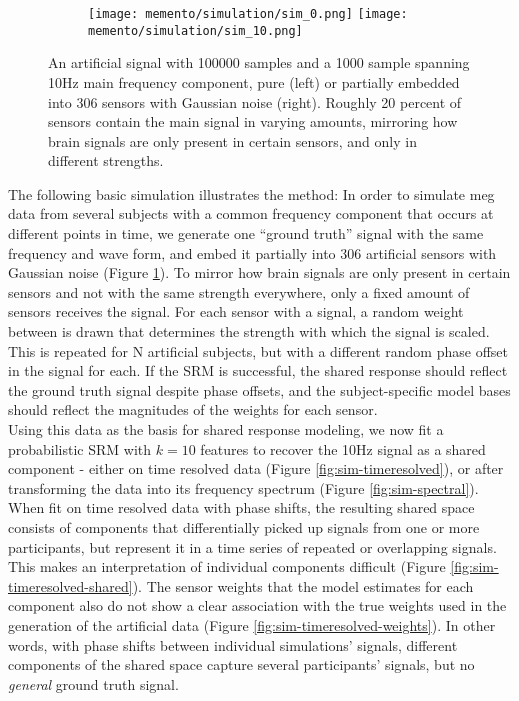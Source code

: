 \begin{figure}
	\begin{subfigure}{1.0\textwidth}
		\texttt{[image: memento/simulation/sim\_0.png]}
		\texttt{[image: memento/simulation/sim\_10.png]}
	\end{subfigure}
	\caption{An artificial signal with 100000 samples and a 1000 sample spanning 10Hz main frequency component, pure (left) or partially embedded into 306 sensors with Gaussian noise (right). Roughly 20 percent of sensors contain the main signal in varying amounts, mirroring how brain signals are only present in certain sensors, and only in different strengths.}
	\label{fig:sim_artificial_signal}
\end{figure}

The following basic simulation illustrates the method:
In order to simulate \gls{meg} data from several subjects with a common frequency component that occurs at different points in time, we generate one ``ground truth'' signal with the same frequency and wave form, and embed it partially into 306 artificial sensors with Gaussian noise (Figure \ref{fig:sim_artificial_signal}).
To mirror how brain signals are only present in certain sensors and not with the same strength everywhere, only a fixed amount of sensors receives the signal.
For each sensor with a signal, a random weight between is drawn that determines the strength with which the signal is scaled.
This is repeated for N artificial subjects, but with a different random phase offset in the signal for each.
If the \gls{SRM} is successful, the shared response should reflect the ground truth signal despite phase offsets, and the subject-specific model bases should reflect the magnitudes of the weights for each sensor.\\
Using this data as the basis for shared response modeling, we now fit a probabilistic \gls{SRM} with $k=10$ features to recover the 10Hz signal as a shared component - either on time resolved data (Figure \ref{fig:sim-timeresolved}), or after transforming the data into its frequency spectrum (Figure \ref{fig:sim-spectral}).\\
When fit on time resolved data with phase shifts, the resulting shared space consists of components that differentially picked up signals from one or more participants, but represent it in a time series of repeated or overlapping signals.
This makes an interpretation of individual components difficult (Figure \ref{fig:sim-timeresolved-shared}).
The sensor weights that the model estimates for each component also do not show a clear association with the true weights used in the generation of the artificial data (Figure \ref{fig:sim-timeresolved-weights}).
In other words, with phase shifts between individual simulations' signals, different components of the shared space capture several participants' signals, but no \textit{general} ground truth signal.

